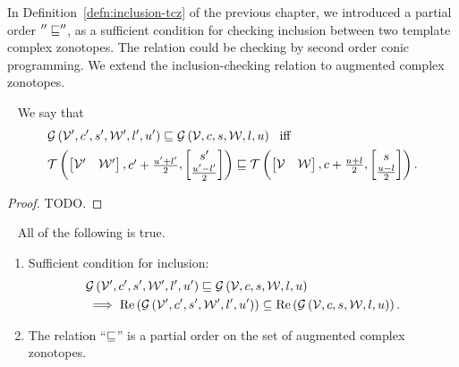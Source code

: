 %
 In Definition~\ref{defn:inclusion-tcz} of the previous chapter, we
 introduced a partial order $''\sqsubseteq''$, as a sufficient condition
 for checking inclusion between two template complex zonotopes.  The
 relation could be checking by second order conic programming.  We
 extend the inclusion-checking relation to augmented complex zonotopes.
%
\begin{definition}~\label{defn:inclusion-acz}
We say that
%
\begin{align*}
& \mathcal{G}\left(\mathcal{V}^\prime,c^\prime,s^\prime,\mathcal{W}^\prime,l^\prime,u^\prime\right) \sqsubseteq
 \mathcal{G}\left(\mathcal{V},c,s,\mathcal{W},l,u\right)~~\text{iff}\\
& \mathit{\operatorname{\mathcal{T}}}\left(\left[\begin{matrix}
      \mathcal{V}^\prime &
      \mathcal{W}^\prime
    \end{matrix}\right]
  ,\begin{matrix}
      c^\prime+\frac{u^\prime+l^\prime}{2}
    \end{matrix}
  ,\left[\begin{matrix}
      s^\prime\\
      \frac{u^\prime-l^\prime}{2}
    \end{matrix}\right]
  \right)  
  \sqsubseteq
  \mathit{\operatorname{\mathcal{T}}}\left(\left[\begin{matrix}
      \mathcal{V} &
      \mathcal{W}
    \end{matrix}\right]
  ,\begin{matrix}
      c+\frac{u+l}{2}
    \end{matrix}
  ,\left[\begin{matrix}
      s\\
      \frac{u-l}{2}
    \end{matrix}\right]
  \right).
\end{align*}
%
\end{definition}
%
\begin{proof}
{\color{red} TODO}.
\end{proof}
%
\begin{theorem}~\label{thm:acz-inclusion}
All of the following is true.
\begin{enumerate}
  \item Sufficient condition for inclusion:
%
    \begin{align*}
& \mathcal{G}\left(\mathcal{V}^\prime,c^\prime,s^\prime,\mathcal{W}^\prime,l^\prime,u^\prime\right)\sqsubseteq\mathcal{G}\left(\mathcal{V},c,s,\mathcal{W},l,u\right)\\    
&\implies \operatorname{Re}\left(\mathcal{G}\left(\mathcal{V}^\prime,c^\prime,s^\prime,\mathcal{W}^\prime,l^\prime,u^\prime\right)\right)\subseteq\operatorname{Re}\left(\mathcal{G}\left(\mathcal{V},c,s,\mathcal{W},l,u\right)\right).
\end{align*}
%
\item The relation ``$\sqsubseteq$'' is a partial order on the set of
  augmented complex zonotopes.
\end{enumerate}
%
\end{theorem}
